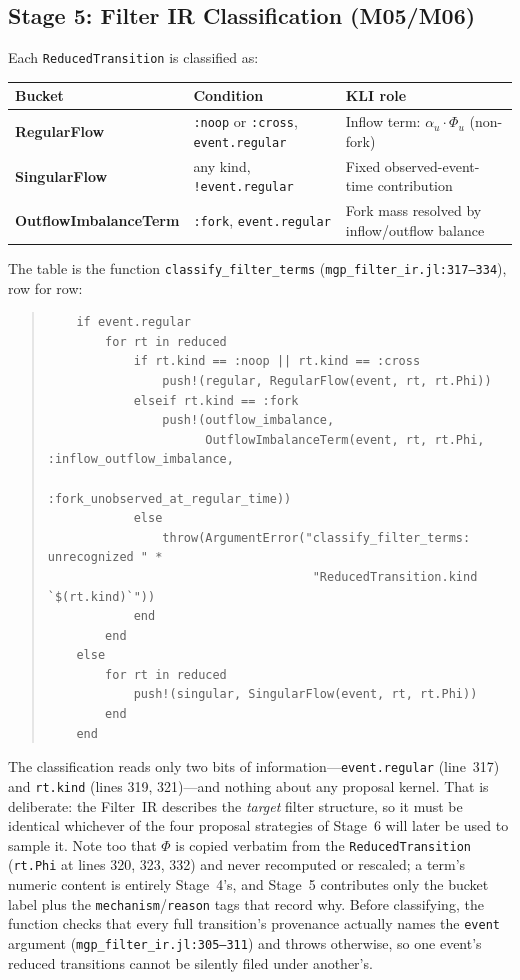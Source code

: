 \documentclass[11pt,leqno]{article}
\newcommand{\code}[1]{\texttt{#1}}
\theoremstyle{plain}
\theoremstyle{definition}
\begin{document}
\subsection{Stage 5: Filter IR Classification (M05/M06)}

Each \code{ReducedTransition} is classified as:
\begin{center}
\renewcommand{\arraystretch}{1.2}
\begin{tabular}{@{}p{}p{}p{}@{}}
\toprule
\textbf{Bucket} & \textbf{Condition} & \textbf{KLI role} \\
\midrule
\textbf{RegularFlow} & \code{:noop} or \code{:cross},
  \code{event.regular} &
  Inflow term: $\alpha_u \cdot \Phi_u$ (non-fork) \\
\textbf{SingularFlow} & any kind, \code{!event.regular} &
  Fixed observed-event-time contribution \\
\textbf{OutflowImbalanceTerm} & \code{:fork}, \code{event.regular} &
  Fork mass resolved by inflow/outflow balance \\
\bottomrule
\end{tabular}
\end{center}

The table is the function \code{classify\_filter\_terms}
(\code{mgp\_filter\_ir.jl:317--334}), row for row:
\begin{quote}
{\small
\begin{verbatim}
    if event.regular
        for rt in reduced
            if rt.kind == :noop || rt.kind == :cross
                push!(regular, RegularFlow(event, rt, rt.Phi))
            elseif rt.kind == :fork
                push!(outflow_imbalance,
                      OutflowImbalanceTerm(event, rt, rt.Phi, :inflow_outflow_imbalance,
                                            :fork_unobserved_at_regular_time))
            else
                throw(ArgumentError("classify_filter_terms: unrecognized " *
                                     "ReducedTransition.kind `$(rt.kind)`"))
            end
        end
    else
        for rt in reduced
            push!(singular, SingularFlow(event, rt, rt.Phi))
        end
    end
\end{verbatim}
}
\end{quote}
The classification reads only two bits of information---\code{event.regular}
(line~317) and \code{rt.kind} (lines 319, 321)---and nothing about any
proposal kernel.  That is deliberate: the Filter~IR describes the
\emph{target} filter structure, so it must be identical whichever of the
four proposal strategies of Stage~6 will later be used to sample it.  Note
too that $\Phi$ is copied verbatim from the \code{ReducedTransition}
(\code{rt.Phi} at lines 320, 323, 332) and never recomputed or rescaled; a
term's numeric content is entirely Stage~4's, and Stage~5 contributes only the
bucket label plus the \code{mechanism}/\code{reason} tags that record why.
Before classifying, the function checks that every full transition's
provenance actually names the \code{event} argument
(\code{mgp\_filter\_ir.jl:305--311}) and throws otherwise, so one event's
reduced transitions cannot be silently filed under another's.
\end{document}

